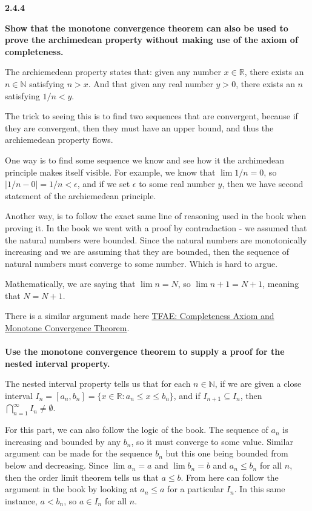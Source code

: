 \label{abbott:2.4.4}

\textbf{2.4.4}

\textbf{Show that the monotone convergence theorem can also be used to prove the archimedean property
without making use of the axiom of completeness.}

The archiemedean property states that: given any number $x\in\mathbb{R}$, there exists an
$n\in\mathbb{N}$ satisfying $n>x$.
And that given any real number $y>0$, there exists an $n$ satisfying $1/n < y$.

The trick to seeing this is to find two sequences that are convergent, because if they are convergent,
then they must have an upper bound, and thus the archiemedean property flows.

One way is to find some sequence we know and see how it the archimedean principle makes itself visible.
For example, we know that $\lim 1/n = 0$, so $|1/n - 0| = 1/n < \epsilon$, and if we set
$\epsilon$ to some real number $y$, then we have second statement of the archiemedean principle.

Another way, is to follow the exact same line of reasoning used in the book when proving it.
In the book we went with a proof by contradaction - we assumed that the natural numbers were bounded.
Since the natural numbers are monotonically increasing and we are assuming that they are bounded,
then the sequence of natural numbers must converge to some number.
Which is hard to argue.

Mathematically, we are saying that $\lim n = N$, so $\lim n+1 = N+1$, meaning that $N = N+1$.

There is a similar argument made here
\href{https://math.stackexchange.com/questions/90127/tfae-completeness-axiom-and-monotone-convergence-theorem}{TFAE: Completeness Axiom and Monotone Convergence Theorem}.
\\~\\


\textbf{Use the monotone convergence theorem to supply a proof for the nested interval property.}

The nested interval property tells us that for each $n\in\mathbb{N}$, if we are given a close interval
$I_n = [a_n, b_n] = \{ x\in\mathbb{R}: a_n \leq x \leq b_n \}$,
and if $I_{n+1} \subseteq I_n$, then
$\bigcap^{\infty}_{n=1} I_n \neq \emptyset$.

For this part, we can also follow the logic of the book.
The sequence of $a_n$ is increasing and bounded by any $b_n$, so it must converge to some value.
Similar argument can be made for the sequence $b_n$ but this one being bounded from below and decreasing.
Since $\lim a_n = a$ and $\lim b_n = b$ and $a_n \leq b_n$ for all $n$, then the order limit theorem
tells us that $a \leq b$.
From here can follow the argument in the book by looking at $a_n \leq a$ for a particular $I_n$.
In this same instance, $a<b_n$, so $a\in I_n$ for all $n$.
\\~\\



